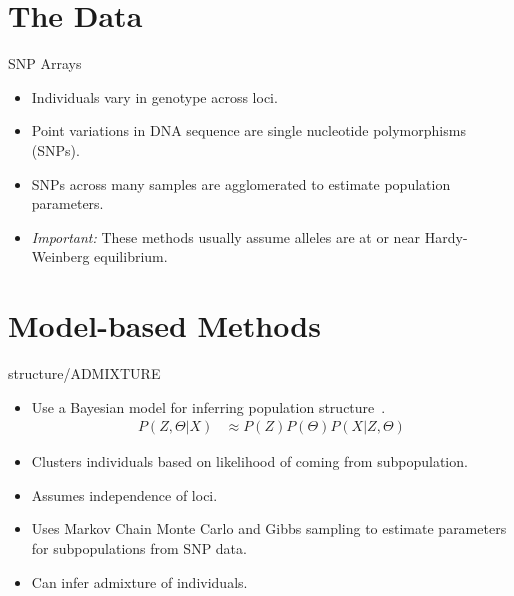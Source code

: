 \documentclass{beamer}
\begin{document}
\section{The Data}

\begin{frame}{SNP Arrays}
  \begin{itemize}
    \item Individuals vary in genotype across loci.
    \item Point variations in DNA sequence are single nucleotide polymorphisms
      (SNPs).
    \item SNPs across many samples are agglomerated to estimate population
      parameters.
    \item \textit{Important:} These methods usually assume alleles are at or
      near Hardy-Weinberg equilibrium.
  \end{itemize}
\end{frame}


\section{Model-based Methods}

\begin{frame}{structure/ADMIXTURE}
  \begin{itemize}
    \item Use a Bayesian model for inferring population
      structure~\cite{pritchard_inference_2000,falush_inference_nodate,alexander_fast_2009}.
      \begin{align*}
        P(Z,\Theta|X) &\approx P(Z)P(\Theta)P(X|Z,\Theta)
      \end{align*}
    \item Clusters individuals based on likelihood of coming from
      subpopulation.
    \item Assumes independence of loci.
    \item Uses Markov Chain Monte Carlo and Gibbs sampling to estimate
      parameters for subpopulations from SNP data.
    \item Can infer admixture of individuals.
  \end{itemize}
\end{frame}

\end{document}
